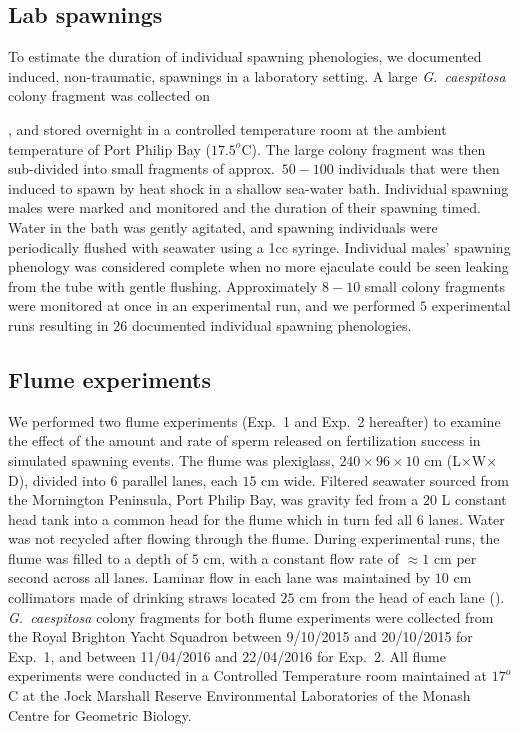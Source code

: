 \documentclass{article}
\begin{document}
	\subsection*{Lab spawnings}
	To estimate the duration of individual spawning phenologies, we documented induced, non-traumatic, spawnings in a laboratory setting. A large \textit{G.~caespitosa} colony fragment was collected on \date{16/11/16}, and stored overnight in a controlled temperature room at the ambient temperature of Port Philip Bay ($17.5^o$C). The large colony fragment was then sub-divided into small fragments of approx.~$50-100$ individuals that were then induced to spawn by heat shock in a shallow sea-water bath. Individual spawning males were marked and monitored and the duration of their spawning timed. Water in the bath was gently agitated, and spawning individuals were periodically flushed with seawater using a 1cc syringe. Individual males' spawning phenology was considered complete when no more ejaculate could be seen leaking from the tube with gentle flushing. Approximately $8-10$ small colony fragments were monitored at once in an experimental run, and we performed $5$ experimental runs resulting in $26$ documented individual spawning phenologies. 

	\subsection*{Flume experiments}
	We performed two flume experiments (Exp.~1 and Exp.~2 hereafter) to examine the effect of the amount and rate of sperm released on fertilization success in simulated spawning events. The flume was plexiglass, $240 \times 96 \times 10$ cm (L$\times$W$\times$D), divided into $6$ parallel lanes, each $15$ cm wide. Filtered seawater sourced from the Mornington Peninsula, Port Philip Bay, was gravity fed from a $20$ L constant head tank into a common head for the flume which in turn fed all $6$ lanes. Water was not recycled after flowing through the flume. During experimental runs, the flume was filled to a depth of $5$ cm, with a constant flow rate of $\approx 1$ cm per second across all lanes. Laminar flow in each lane was maintained by $10$ cm collimators made of drinking straws located $25$ cm from the head of each lane (\citealt{YundMeidel2003}). \textit{G.~caespitosa} colony fragments for both flume experiments were collected from the Royal Brighton Yacht Squadron between 9/10/2015 and 20/10/2015 for Exp.~1, and between 11/04/2016 and 22/04/2016 for Exp.~2. All flume experiments were conducted in a Controlled Temperature room maintained at $17^o$ C at the Jock Marshall Reserve Environmental Laboratories of the Monash Centre for Geometric Biology.
\end{document}
